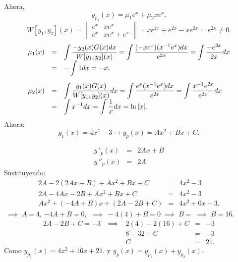 \documentclass[9pt]{beamer}
\begin{document}
\begin{frame}[t]
	\begin{exampleblock}{}
		Ahora,
		\[
			y_{p_2} (x) = \mu _1e^x+ \mu _2xe^x.
		\]
		\[
			W[y_1,y_2] (x) = \begin{vmatrix}
				e^x & xe^x \\
				e^x & xe^x+e^x
			\end{vmatrix} = xe^{2x} +e^{2x} -xe^{2x} = e^{2x} \ne 0.
		\]
		\[
			\begin{array}{rcl}
				\mu _1(x) & = & \displaystyle\int \dfrac{-y_2(x) G(x) dx}{W[y_1,y_2] (x)} = \displaystyle\int \dfrac{(-xe^{x}) (x^{-1} e^x) dx}{e^{2x}} = \displaystyle\int \dfrac{-e^{2x}}{2x} dx \\[2mm]
				& = & - \displaystyle\int 1dx = -x.\\[5mm]
				\mu _2(x) & = & \displaystyle\int \dfrac{y_1(x) G(x)}{W[y_1,y_2] (x)} dx = \displaystyle\int \dfrac{e^x(x^{-1} e^{x}) dx}{e^{2x}} = \displaystyle\int \dfrac{x^{-1} e^{2x}}{e^{2x}} dx \\[2mm]
				& = & \displaystyle\int x^{-1} dx = \displaystyle\int \dfrac{1}{x} dx = \ln |x|.
			\end{array}
		\]
		Ahora: 
		\[
			g_1(x) = 4x^2-3 \longrightarrow y_p(x) = Ax^2+Bx+C.
		\]
	\end{exampleblock}
\end{frame}

\begin{frame}[t]
	\begin{exampleblock}{}
		\[
			\begin{array}{rcl}
				y\,'_p(x) & = & 2Ax+B \\[2mm]
				y\,'' _p(x) & = & 2A
			\end{array}
		\]
		Sustituyendo:
		\[
			\begin{array}{rcl}
				2A-2(2Ax+B) +Ax^2+Bx+C & = & 4x^2-3 \\[2mm]
				2A-4Ax-2B+Ax^2+Bx+C & = & 4x^2-3 \\[2mm]
				Ax^2+(-4A+B) x+(2A-2B+C) & = & 4x^2+0x-3.
			\end{array}
		\]
		\(\;\implies\;  A=4\), \(-4A+B = 0\), \(\;\implies\; -4(4) +B=0 \;\implies\; B= \;\implies\; B=16\). \\[2mm]
		\[
			\begin{array}{rrrcl}
				2A-2B+C=-3 & \;\implies\; & 2(4) -2(16) +C & = & -3 \\[2mm]
				&& 8-32+C & = & -3 \\[2mm]
				&& C & = & 21.
			\end{array}
		\]
		Como \(y_{p_1}(x) = 4x^2+16x+21\), y \(y_p(x) = y_{p_1} (x) + y_{p_2} (x)\).
	\end{exampleblock}
\end{frame}
\end{document}
